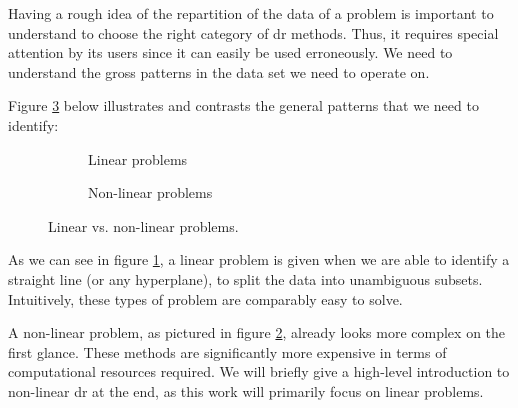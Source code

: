 Having a rough idea of the repartition of the data of a problem is important to understand to choose the right category of \gls{dr} methods.
Thus, it requires special attention by its users since it can easily be used erroneously.
We need to understand the gross patterns in the data set we need to operate on.
\bigskip

Figure \ref{fig:linearvsnonlinearproblems} below illustrates and contrasts the general patterns that we need to identify:%
\vspace*{2mm}

\renewcommand{\tikzscale}{1.2}
\begin{figure}[h]
	\begin{subfigure}{0.49\textwidth}
	    \caption{Linear problems}
		
	    \label{subfig:linearproblems}
	\end{subfigure}
	\hfill
	\begin{subfigure}{0.49\textwidth}
	    \caption{Non-linear problems}
		
	    \label{subfig:nonlinearproblems}
	\end{subfigure}
\caption{Linear vs. non-linear problems.}
\label{fig:linearvsnonlinearproblems}
\end{figure}
\bigskip

As we can see in figure \ref{subfig:linearproblems}, a linear problem is given when we are able to identify a straight line (or any \gls{hyperplane}), to split the data into unambiguous subsets.
Intuitively, these types of problem are comparably easy to solve.
\medskip

A non-linear problem, as pictured in figure \ref{subfig:nonlinearproblems}, already looks more complex on the first glance.
These methods are significantly more expensive in terms of computational resources required.
We will briefly give a high-level introduction to non-linear \acrlong{dr} at the end, as this work will primarily focus on linear problems.

